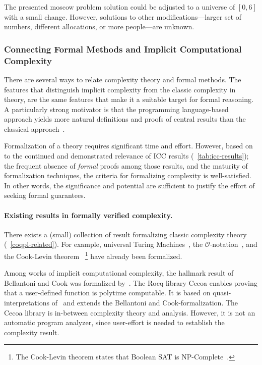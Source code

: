 The presented moscow problem solution could be adjusted to a universe of \([0, 6]\) with a small change.
However, solutions to other modifications---\eg larger set of numbers, different allocations, or more people---are unknown.

\subsubsection{Connecting Formal Methods and Implicit Computational Complexity}
\label{icc-formally}

There are several ways to relate complexity theory and formal methods.
The features that distinguish implicit complexity from the classic complexity in theory, are the same features that make it a suitable target for formal reasoning.
A particularly strong motivator is that the programming language-based approach yields more natural definitions and proofs of central results than the classical approach~\cite{kristiansen2017}.

Formalization of a theory requires significant time and effort.
However, based on to the continued and demonstrated relevance of ICC results (\cf~\autoref{tab:icc-results});
the frequent absence of \emph{formal} proofs among those results, and the maturity of formalization techniques, the criteria for formalizing complexity is well-satisfied.
In other words, the significance and potential are sufficient to justify the effort of seeking formal guarantees.

\paragraph*{Existing results in formally verified complexity.}
There exists a (small) collection of result formalizing classic complexity theory (\cf~\autoref{coqpl-related}).
For example, universal Turing Machines~\cite{forster2020}, the \(\mathcal{O}\)-notation~\cite{gueneau2018},
and the Cook-Levin theorem~\cite{gaher2021}%
\footnote{The Cook-Levin theorem states that Boolean SAT is NP-Complete~\cite{cook1971, levin1973}.}
have already been formalized.

Among works of implicit computational complexity, the hallmark result of Bellantoni and Cook was formalized by~\textcite{heraud2011}.
The Rocq library Cecoa enables proving that a user-defined function is polytime computable.
It is based on quasi-interpretations of~\textcite{marion2000} and extends the Bellantoni and Cook-formalization.
The Cecoa library is in-between complexity theory and analysis.
However, it is not an automatic program analyzer, since user-effort is needed to establish the complexity result.

